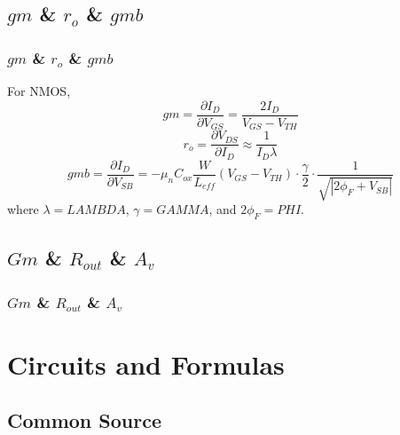 \documentclass{beamer}
\begin{document}
\subsection{$gm$ \& $r_o$ \& $gmb$} 
\begin{frame}
    \frametitle{$gm$ \& $r_o$ \& $gmb$}
    For NMOS, 
    \begin{equation*}
            \boxed{gm = \frac{\partial I_D}{\partial V_{GS}} = \frac{2I_D}{V_{GS}-V_{TH}}}
    \end{equation*}
    \begin{equation*}
            \boxed{r_o = \frac{\partial V_{DS}}{\partial I_D} \approx \frac{1}{I_D\lambda}}
    \end{equation*}
    \begin{equation*}
            \boxed{gmb = \frac{\partial I_D}{\partial V_{SB}} = -\mu_n C_{ox} \frac{W}{L_{eff}}(V_{GS}-V_{TH})\cdot \frac{\gamma}{2}\cdot \frac{1}{\sqrt{|2\phi_F+V_{SB}|}}}
    \end{equation*}
    where $\lambda = LAMBDA$, $\gamma = GAMMA$, and $2\phi_F = PHI$. 
\end{frame}

\subsection{$Gm$ \& $R_{out}$ \& $A_v$}
\begin{frame}
    \frametitle{$Gm$ \& $R_{out}$ \& $A_v$}

    

\end{frame}

\section{Circuits and Formulas} %

\subsection{Common Source} %
\end{document}
